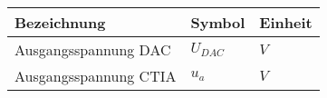 \begin{center}
		\begin{longtable}{p{} p{} p{}}
		\hline
		Bezeichnung  & Symbol &  Einheit \\
		\hline
		\endhead
		\label{tab:ergBerMess}
		\hspace{-1mm}Ausgangsspannung DAC & $U_{D\!AC}$ & $V$\\
		Ausgangsspannung CTIA & $u_{a}$ & $V$\\
		 
	\end{longtable}
\end{center}